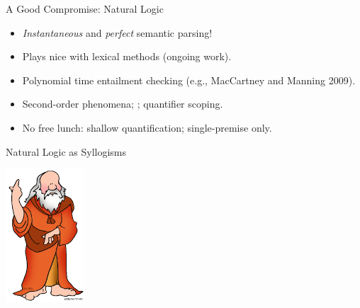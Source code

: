 \begin{frame}{A Good Compromise: Natural Logic}
\begin{center}
\end{center}
\vspace{1em}
\pause

\begin{itemize}
\item \textit{Instantaneous} and \textit{perfect} semantic parsing!
\item Plays nice with lexical methods (ongoing work).
\end{itemize}
\vspace{1ex}
\pause

\begin{itemize}
\item Polynomial time entailment checking (e.g., MacCartney and Manning 2009).
\end{itemize}
\vspace{1ex}
\pause

\begin{itemize}
\item Second-order phenomena; ; quantifier scoping.
\pause
\item No free lunch: shallow quantification; single-premise only.
\end{itemize}
\end{frame}


\def\title{Natural Logic as Syllogisms}
\begin{frame}{\title}
\begin{center}
  \includegraphics[height=5cm]{../img/aristotle.png}
\end{center}
\end{frame}

